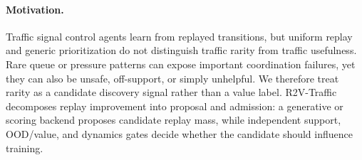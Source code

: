 \paragraph{Motivation.}
Traffic signal control agents learn from replayed transitions, but uniform replay and generic prioritization do not distinguish traffic rarity from traffic usefulness. Rare queue or pressure patterns can expose important coordination failures, yet they can also be unsafe, off-support, or simply unhelpful. We therefore treat rarity as a candidate discovery signal rather than a value label. R2V-Traffic decomposes replay improvement into proposal and admission: a generative or scoring backend proposes candidate replay mass, while independent support, OOD/value, and dynamics gates decide whether the candidate should influence training.
